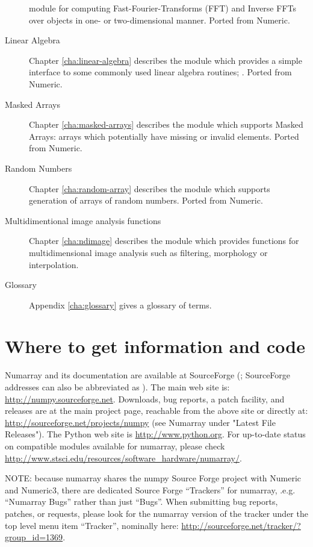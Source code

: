 \begin{description}
    module for computing Fast-Fourier-Transforms
   (FFT) and Inverse FFTs over  objects in one- or
   two-dimensional manner.  Ported from Numeric.
\item[Linear Algebra] Chapter \ref{cha:linear-algebra} describes the
    module which provides a simple
   interface to some commonly used linear algebra routines; 
   .   Ported from Numeric.
\item[Masked Arrays] Chapter \ref{cha:masked-arrays} describes the
    module which supports Masked Arrays: arrays which
   potentially have missing or invalid elements.  Ported from Numeric.
\item[Random Numbers] Chapter \ref{cha:random-array} describes the
    module which supports generation of arrays of
   random numbers.  Ported from Numeric.
\item[Multidimentional image analysis functions] Chapter \ref{cha:ndimage}
   describes the  module which provides
   functions for multidimensional image analysis such as filtering,
   morphology or interpolation.
\item[Glossary] Appendix \ref{cha:glossary} gives a glossary of terms.
\end{description}


\section{Where to get information and code}

Numarray and its documentation are available at SourceForge
(; SourceForge addresses can
also be abbreviated as ). The main web site is:
\url{http://numpy.sourceforge.net}. Downloads, bug reports, a patch facility,
and releases are at the main project page, reachable from the above site or
directly at: \url{http://sourceforge.net/projects/numpy} (see Numarray under
"Latest File Releases").  The Python web site is \url{http://www.python.org}.
For up-to-date status on compatible modules available for numarray, please 
check \url{http://www.stsci.edu/resources/software_hardware/numarray/}.

NOTE: because numarray shares the numpy Source Forge project with Numeric and
Numeric3, there are dedicated Source Forge ``Trackers'' for numarray, .e.g.
``Numarray Bugs'' rather than just ``Bugs''.  When submitting bug reports,
patches, or requests, please look for the numarray version of the tracker under
the top level menu item ``Tracker'', nominally here:
\url{http://sourceforge.net/tracker/?group_id=1369}.

